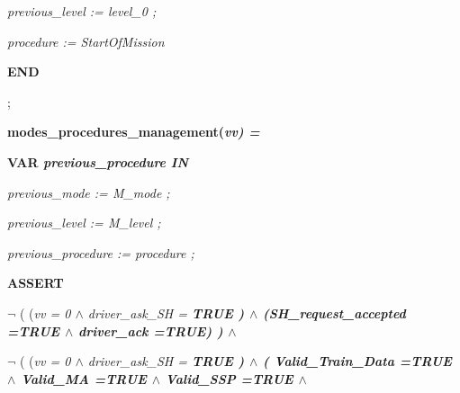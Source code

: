 \documentclass[11pt]{article}
\begin{document}
\begin{sloppypar}
\hspace*{0.35in}\it previous\_level \rm := \it level\_0 \rm ;

\hspace*{0.35in}\it procedure \rm := \it StartOfMission

\hspace*{0.35in}\hspace*{0.15in}\bf END

\hspace*{0.15in}\rm ;

\vspace*{4mm}
\hspace*{0.15in}\bf modes\_procedures\_management\rm (\it vv\rm ) \rm =

\hspace*{0.15in}\bf VAR \it previous\_procedure \bf IN

\hspace*{0.35in}\hspace*{0.35in}\it previous\_mode \rm := \it M\_mode \rm ;

\hspace*{0.35in}\it previous\_level \rm := \it M\_level \rm ;

\hspace*{0.35in}\hspace*{0.35in}\it previous\_procedure \rm := \it procedure \rm ;

\hspace*{0.35in}\hspace*{0.35in}

\hspace*{0.40in}\bf ASSERT

\hspace*{0.60in}\hspace*{0.60in}\hspace*{0.80in} $\neg$  \rm ( \rm (\it vv \rm = \rm 0  $\land$  \it driver\_ask\_SH \rm = \bf TRUE \rm )  $\land$  \rm (\it SH\_request\_accepted \rm =\hspace*{0.10in}\bf TRUE  $\land$  \it driver\_ack \rm =\hspace*{0.10in}\bf TRUE\rm ) \rm )  $\land$ 

\hspace*{0.60in}\hspace*{0.60in} $\neg$ \rm ( \rm (\it vv \rm = \rm 0  $\land$  \it driver\_ask\_SH \rm = \bf TRUE \rm )  $\land$  \rm ( \it Valid\_Train\_Data \rm =\hspace*{0.10in}\bf TRUE  $\land$  \it Valid\_MA \rm =\hspace*{0.10in}\bf TRUE  $\land$  \it Valid\_SSP \rm =\hspace*{0.10in}\bf TRUE  $\land$  


\end{sloppypar}
\end{document}

